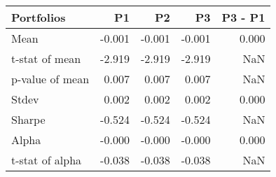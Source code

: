 \begin{tabular}{lrrrr}
\toprule
Portfolios & P1 & P2 & P3 & P3 - P1 \\
\midrule
Mean & -0.001 & -0.001 & -0.001 & 0.000 \\
t-stat of mean & -2.919 & -2.919 & -2.919 & NaN \\
p-value of mean & 0.007 & 0.007 & 0.007 & NaN \\
Stdev & 0.002 & 0.002 & 0.002 & 0.000 \\
Sharpe & -0.524 & -0.524 & -0.524 & NaN \\
Alpha & -0.000 & -0.000 & -0.000 & 0.000 \\
t-stat of alpha & -0.038 & -0.038 & -0.038 & NaN \\
\bottomrule
\end{tabular}
